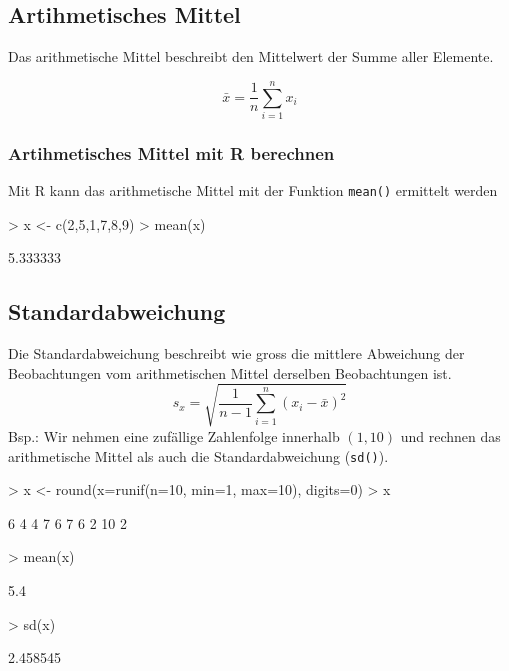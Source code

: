 \subsection{Artihmetisches Mittel}
Das arithmetische Mittel beschreibt den Mittelwert der Summe aller Elemente.

\[ \bar{x} = \frac{1}{n} \sum\limits_{i=1}^{n} x_i \]

\subsubsection{Artihmetisches Mittel mit R berechnen}
Mit R kann das arithmetische Mittel mit der Funktion \verb!mean()! 
ermittelt werden
\begin{Schunk}
\begin{Sinput}
> x <- c(2,5,1,7,8,9)
> mean(x)
\end{Sinput}
\begin{Soutput}
[1] 5.333333
\end{Soutput}
\end{Schunk}

\subsection{Standardabweichung}
Die Standardabweichung beschreibt wie gross die mittlere Abweichung der
Beobachtungen vom arithmetischen Mittel derselben Beobachtungen ist.
\[ s_x = \sqrt{ \frac{1}{n-1} \sum\limits_{i=1}^{n} (x_i - \bar{x})^2 } \]
Bsp.: Wir nehmen eine zufällige Zahlenfolge innerhalb $(1,10)$ und
rechnen das arithmetische Mittel als auch die Standardabweichung (\verb!sd()!).
\begin{Schunk}
\begin{Sinput}
> x <- round(x=runif(n=10, min=1, max=10), digits=0)
> x
\end{Sinput}
\begin{Soutput}
 [1]  6  4  4  7  6  7  6  2 10  2
\end{Soutput}
\begin{Sinput}
> mean(x)
\end{Sinput}
\begin{Soutput}
[1] 5.4
\end{Soutput}
\begin{Sinput}
> sd(x)
\end{Sinput}
\begin{Soutput}
[1] 2.458545
\end{Soutput}
\end{Schunk}

